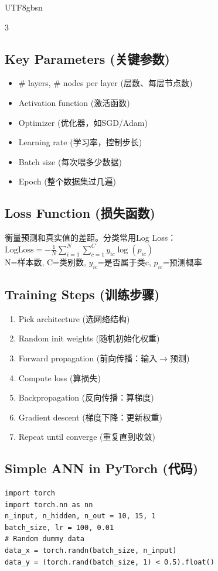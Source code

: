 \documentclass[9pt,landscape,a4paper]{article}
\newcommand{\zhint}[1]{{\scriptsize\color{gray!70!black}#1}}
\begin{document}
\begin{CJK}{UTF8}{gbsn}
\begin{multicols}{3}
\subsection{Key Parameters \zhint{(关键参数)}}
\begin{itemize}[leftmargin=*, nosep, itemsep=0pt]
    \item \# layers, \# nodes per layer \zhint{(层数、每层节点数)}
    \item Activation function \zhint{(激活函数)}
    \item Optimizer \zhint{(优化器，如SGD/Adam)}
    \item Learning rate \zhint{(学习率，控制步长)}
    \item Batch size \zhint{(每次喂多少数据)}
    \item Epoch \zhint{(整个数据集过几遍)}
\end{itemize}

\subsection{Loss Function \zhint{(损失函数)}}
\zhint{衡量预测和真实值的差距。分类常用Log Loss：}
$\text{LogLoss} = -\frac{1}{N}\sum_{i=1}^{N}\sum_{c=1}^{C} y_{ic}\log(p_{ic})$\\
\zhint{N=样本数, C=类别数, $y_{ic}$=是否属于类c, $p_{ic}$=预测概率}

\subsection{Training Steps \zhint{(训练步骤)}}
\begin{enumerate}[leftmargin=*, nosep, itemsep=0pt]
    \item Pick architecture \zhint{(选网络结构)}
    \item Random init weights \zhint{(随机初始化权重)}
    \item Forward propagation \zhint{(前向传播：输入$\to$预测)}
    \item Compute loss \zhint{(算损失)}
    \item Backpropagation \zhint{(反向传播：算梯度)}
    \item Gradient descent \zhint{(梯度下降：更新权重)}
    \item Repeat until converge \zhint{(重复直到收敛)}
\end{enumerate}

\subsection{Simple ANN in PyTorch \zhint{(代码)}}
\begin{lstlisting}
import torch
import torch.nn as nn
n_input, n_hidden, n_out = 10, 15, 1
batch_size, lr = 100, 0.01
# Random dummy data
data_x = torch.randn(batch_size, n_input)
data_y = (torch.rand(batch_size, 1) < 0.5).float()


\end{lstlisting}
\end{multicols}
\end{CJK}
\end{document}
